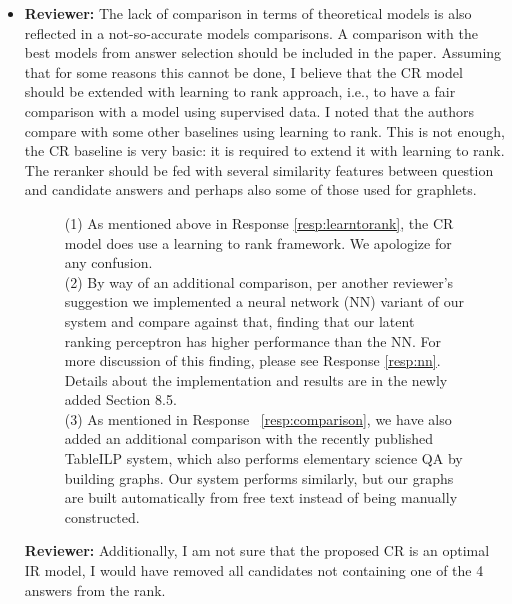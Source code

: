 \documentclass[10pt]{article}
\newcommand{\todo}[1]{\textcolor{red}{TODO: #1}}
\begin{document}
\begin{itemize}
\item \textbf{Reviewer:} The lack of comparison in terms of theoretical models is also reflected
in a not-so-accurate models comparisons.
A comparison with the best models from answer selection should be included
in the paper.
Assuming that for some reasons this cannot be done, I believe that the CR
model should be extended with learning to rank approach, i.e., to have a
fair comparison with a model using supervised data.
I noted that the authors compare with some other baselines using learning to
rank. This is not enough, the CR baseline is very basic: it is required to
extend it with learning to rank.
The reranker should be fed with several similarity features between question
and candidate answers and perhaps also some of those used for graphlets.

\begin{figure}[H]
\caption{ (1) As mentioned above in Response \ref{resp:learntorank}, the CR model does use a learning to rank framework.  We apologize for any confusion. ~\\
(2) By way of an additional comparison, per another reviewer's suggestion we implemented a neural network (NN) variant of our system and compare against that, finding that our latent ranking perceptron has higher performance than the NN.  For more discussion of this finding, please see Response \ref{resp:nn}.  Details about the implementation and results are in the newly added Section 8.5.~\\
(3) As mentioned in Response ~\ref{resp:comparison}, we have also added an additional comparison with the recently published TableILP system, which also performs elementary science QA by building graphs.  Our system performs similarly, but our graphs are built automatically from free text instead of being manually constructed. }
\end{figure}



\textbf{Reviewer:} Additionally, I am not sure that the proposed CR is an optimal IR model, I
would have removed all candidates not containing one of the 4 answers from
the rank.



\end{itemize}
\end{document}
